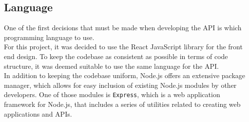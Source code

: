 \subsection{Language}
One of the first decisions that must be made when developing the API is which programming language to use.\\
For this project, it was decided to use the React JavaScript library for the front end design.
To keep the codebase as consistent as possible in terms of code structure, it was deemed suitable to use the same language for the API.\\
In addition to keeping the codebase uniform, Node.js offers an extensive package manager, which allows for easy inclusion of existing Node.js modules by other developers.
One of those modules is \texttt{Express}, which is a web application framework for Node.js, that includes a series of utilities related to creating web applications and APIs.
